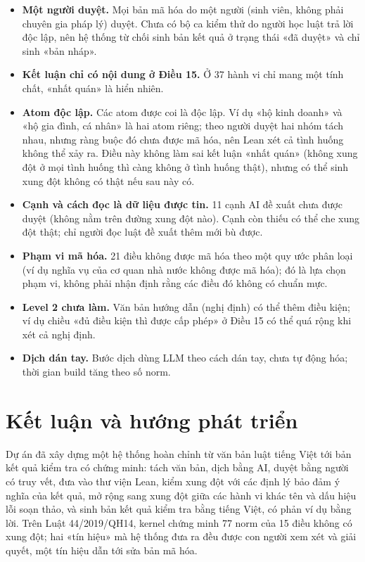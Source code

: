 \documentclass[12pt,a4paper]{article}
\begin{document}
\begin{itemize}
  \item \textbf{Một người duyệt.} Mọi bản mã hóa do một người (sinh viên, không phải chuyên gia pháp lý) duyệt. Chưa có bộ ca
    kiểm thử do người học luật trả lời độc lập, nên hệ thống từ chối sinh bản kết quả ở trạng thái «đã duyệt» và chỉ sinh «bản nháp».
  \item \textbf{Kết luận chỉ có nội dung ở Điều 15.} Ở 37 hành vi chỉ mang một tính chất, «nhất quán» là hiển nhiên.
  \item \textbf{Atom độc lập.} Các atom được coi là độc lập. Ví dụ «hộ kinh doanh» và «hộ gia đình, cá nhân» là hai atom riêng;
    theo người duyệt hai nhóm tách nhau, nhưng ràng buộc đó chưa được mã hóa, nên Lean xét cả tình huống không thể xảy ra. Điều
    này không làm sai kết luận «nhất quán» (không xung đột ở mọi tình huống thì càng không ở tình huống thật), nhưng có thể sinh
    xung đột không có thật nếu sau này có.
  \item \textbf{Cạnh và cách đọc là dữ liệu được tin.} 11 cạnh AI đề xuất chưa được duyệt (không nằm trên đường xung đột nào).
    Cạnh còn thiếu có thể che xung đột thật; chỉ người đọc luật đề xuất thêm mới bù được.
  \item \textbf{Phạm vi mã hóa.} 21 điều không được mã hóa theo một quy ước phân loại (ví dụ nghĩa vụ của cơ quan nhà nước không
    được mã hóa); đó là lựa chọn phạm vi, không phải nhận định rằng các điều đó không có chuẩn mực.
  \item \textbf{Level 2 chưa làm.} Văn bản hướng dẫn (nghị định) có thể thêm điều kiện; ví dụ chiều «đủ điều kiện thì được cấp
    phép» ở Điều 15 có thể quá rộng khi xét cả nghị định.
  \item \textbf{Dịch dán tay.} Bước dịch dùng LLM theo cách dán tay, chưa tự động hóa; thời gian build tăng theo số norm.
\end{itemize}

\section{Kết luận và hướng phát triển}

Dự án đã xây dựng một hệ thống hoàn chỉnh từ văn bản luật tiếng Việt tới bản kết quả kiểm tra có chứng minh: tách văn bản, dịch bằng AI,
duyệt bằng người có truy vết, đưa vào thư viện Lean, kiểm xung đột với các định lý bảo đảm ý nghĩa của kết quả, mở rộng sang
xung đột giữa các hành vi khác tên và dấu hiệu lỗi soạn thảo, và sinh bản kết quả kiểm tra bằng tiếng Việt, có phản ví dụ bằng lời. Trên Luật
44/2019/QH14, kernel chứng minh 77 norm của 15 điều không có xung đột; hai «tín hiệu» mà hệ thống đưa ra đều được con người xem
xét và giải quyết, một tín hiệu dẫn tới sửa bản mã hóa.
\end{document}
